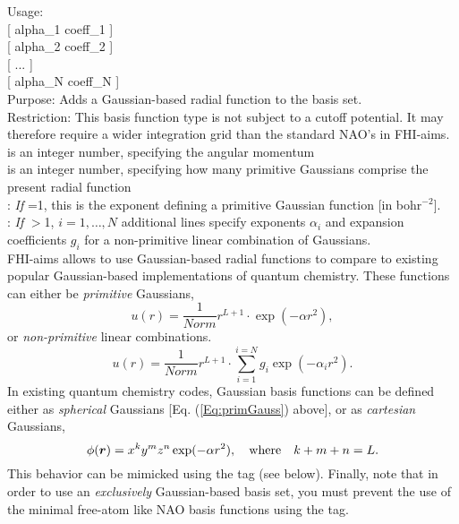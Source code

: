 {
  \noindent
  Usage:   
    \option{[alpha]} \\
    \hspace*{0.1\textwidth} [ alpha\_1  coeff\_1 ] \\
    \hspace*{0.1\textwidth} [ alpha\_2  coeff\_2 ] \\
    \hspace*{0.1\textwidth} [ ... ] \\
    \hspace*{0.1\textwidth} [ alpha\_N  coeff\_N ]
    \\[1.0ex]
  Purpose: Adds a Gaussian-based radial function to the basis
    set. \\[1.0ex]
  Restriction: This basis function type is not subject to a cutoff
    potential. It may therefore require a wider
     integration grid than the standard
    NAO's in FHI-aims. \\[1.0ex]
   is an integer number, specifying the angular momentum \\ 
   is an integer number, specifying how many primitive Gaussians
    comprise the present radial function \\
   : \emph{If} =1, this is the exponent
    defining a primitive Gaussian function [in bohr$^{-2}$]. \\
    : 
    \emph{If} $>$1, $i=1,\dots,N$ additional lines specify
    exponents $\alpha_i$ and expansion coefficients $g_i$ for a
    non-primitive linear combination of Gaussians.\\
}
FHI-aims allows to use Gaussian-based radial functions to compare to
existing popular Gaussian-based implementations of quantum
chemistry. These functions can either be \emph{primitive} Gaussians, 
\begin{equation}\label{Eq:primGauss}
 u(r) = \frac{1}{\mathit{Norm}} r^{L+1} \cdot \exp(-\alpha r^2) ,
\end{equation}
or \emph{non-primitive} linear combinations.
\begin{equation}\label{Eq:nonprimGauss}
 u(r) = \frac{1}{\mathit{Norm}} r^{L+1} \cdot \sum_{i=1}^{i=N} g_i \exp(-\alpha_i r^2) .
\end{equation}
In existing quantum chemistry codes, Gaussian basis functions can be
defined either as \emph{spherical} Gaussians [Eq. (\ref{Eq:primGauss})
  above], or as \emph{cartesian} Gaussians,
\begin{equation}
 \phi(\mbox{\boldmath$r$}) = x^k y^m z^n \exp(-\alpha r^2) , \quad \mathrm{where} \quad
 k+m+n=L .
\end{equation}
This behavior can be mimicked using the
 tag (see below). Finally, note that
in order to use an \emph{exclusively} Gaussian-based basis set, you
must prevent the use of the minimal free-atom like NAO basis functions
using the  tag.


